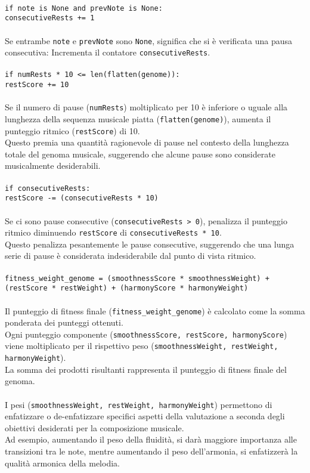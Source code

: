 \documentclass[a4paper,12pt]{report}
\begin{document}
\\
\texttt{\small if note is None and prevNote is None:} \\
\indent \texttt{\small consecutiveRests += 1} \\
\\
Se entrambe \texttt{note} e \texttt{prevNote} sono \texttt{None}, significa che si è verificata una pausa consecutiva: Incrementa il contatore \texttt{consecutiveRests}. \\
\\
\texttt{\small if numRests * 10 <= len(flatten(genome)):} \\
\indent \texttt{\small restScore += 10} \\
\\
Se il numero di pause (\texttt{numRests}) moltiplicato per 10 è inferiore o uguale alla lunghezza della sequenza musicale piatta (\texttt{flatten(genome)}), aumenta il punteggio ritmico (\texttt{restScore}) di 10. \\
Questo premia una quantità ragionevole di pause nel contesto della lunghezza totale del genoma musicale, suggerendo che alcune pause sono considerate musicalmente desiderabili. \\
\\
\texttt{\small if consecutiveRests:} \\
\indent \texttt{\small restScore -= (consecutiveRests * 10)} \\
\\
Se ci sono pause consecutive (\texttt{consecutiveRests > 0}), penalizza il punteggio ritmico diminuendo \texttt{restScore} di \texttt{consecutiveRests * 10}. \\
Questo penalizza pesantemente le pause consecutive, suggerendo che una lunga serie di pause è considerata indesiderabile dal punto di vista ritmico. \\
\\
\texttt{\small fitness\_weight\_genome = (smoothnessScore * smoothnessWeight) + (restScore * restWeight) + (harmonyScore * harmonyWeight)} \\
\\
Il punteggio di fitness finale (\texttt{fitness\_weight\_genome}) è calcolato come la somma ponderata dei punteggi ottenuti. \\
Ogni punteggio componente (\texttt{smoothnessScore, restScore, harmonyScore}) viene moltiplicato per il rispettivo peso (\texttt{smoothnessWeight, restWeight, harmonyWeight}). \\
La somma dei prodotti risultanti rappresenta il punteggio di fitness finale del genoma. \\
\\
I pesi (\texttt{smoothnessWeight, restWeight, harmonyWeight}) permettono di enfatizzare o de-enfatizzare specifici aspetti della valutazione a seconda degli obiettivi desiderati per la composizione musicale. \\
Ad esempio, aumentando il peso della fluidità, si darà maggiore importanza alle transizioni tra le note, mentre aumentando il peso dell'armonia, si enfatizzerà la qualità armonica della melodia. \\
\end{document}
